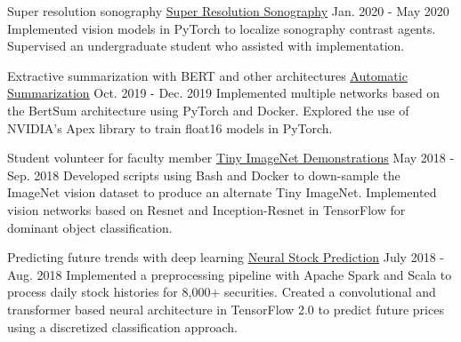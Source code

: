 

\begin{cventries}

  \cventry
  	{Super resolution sonography} %
		{
			\href{https://github.com/TidalPaladin/sr-mb}
      {\underline{Super Resolution Sonography}}
		} %
  	{Jan. 2020 - May 2020} %
    {} %
	{
    Implemented vision models in PyTorch to localize sonography contrast agents.
    Supervised an undergraduate student who assisted with implementation.
	}

  \cventry
  	{Extractive summarization with BERT and other architectures} %
		{
			\href{https://github.com/TidalPaladin/neural-summarizer}
      {\underline{Automatic Summarization}}
		} %
  	{Oct. 2019 - Dec. 2019} %
    {} %
	{
    Implemented multiple networks based on the BertSum architecture using PyTorch 
    and Docker. Explored the use of NVIDIA's Apex library to train float16 models 
    in PyTorch.
	}

  \cventry
  	{Student volunteer for faculty member} %
		{
			\href{https://github.com/TidalPaladin/tiny-imagenet-demo}
      {\underline{Tiny ImageNet Demonstrations}}
		} %
  	{May 2018 - Sep. 2018} %
    {} %
	{
		Developed scripts using Bash and Docker to down-sample
		the ImageNet vision dataset to produce an alternate Tiny ImageNet.
		Implemented vision networks based on Resnet and
		Inception-Resnet in TensorFlow for dominant object
		classification.
	}

  \cventry
  	{Predicting future trends with deep learning} %
		{
			\href{https://github.com/TidalPaladin/trader}
      {\underline{Neural Stock Prediction}}
		} %
  	{July 2018 - Aug. 2018} %
    {} %
	{
		Implemented a preprocessing pipeline with Apache Spark and Scala
		to process daily stock histories for 8,000+ securities.
		Created a convolutional and transformer based neural architecture
		in TensorFlow 2.0 to predict future prices using a discretized
		classification approach.
	}

\end{cventries}
